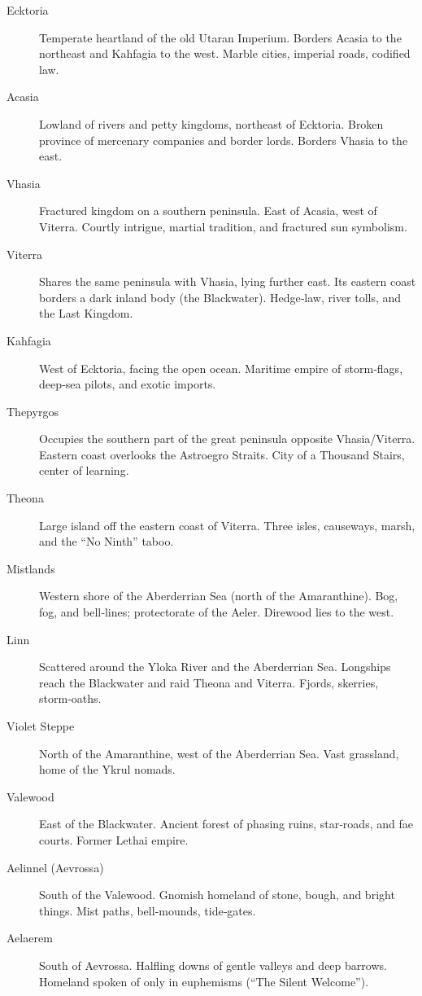 \begin{description}
  \item[Ecktoria]  Temperate heartland of the old Utaran Imperium. Borders Acasia to the northeast and Kahfagia to the west. Marble cities, imperial roads, codified law.
  \item[Acasia]  Lowland of rivers and petty kingdoms, northeast of Ecktoria. Broken province of mercenary companies and border lords. Borders Vhasia to the east.
  \item[Vhasia]  Fractured kingdom on a southern peninsula. East of Acasia, west of Viterra. Courtly intrigue, martial tradition, and fractured sun symbolism.
  \item[Viterra]  Shares the same peninsula with Vhasia, lying further east. Its eastern coast borders a dark inland body (the Blackwater). Hedge‑law, river tolls, and the Last Kingdom.
  \item[Kahfagia]  West of Ecktoria, facing the open ocean. Maritime empire of storm‑flags, deep‑sea pilots, and exotic imports.
  \item[Thepyrgos]  Occupies the southern part of the great peninsula opposite Vhasia/Viterra. Eastern coast overlooks the Astroegro Straits. City of a Thousand Stairs, center of learning.
  \item[Theona]  Large island off the eastern coast of Viterra. Three isles, causeways, marsh, and the ``No Ninth'' taboo.
  \item[Mistlands]  Western shore of the Aberderrian Sea (north of the Amaranthine). Bog, fog, and bell‑lines; protectorate of the Aeler. Direwood lies to the west.
  \item[Linn]  Scattered around the Yloka River and the Aberderrian Sea. Longships reach the Blackwater and raid Theona and Viterra. Fjords, skerries, storm‑oaths.
  \item[Violet Steppe]  North of the Amaranthine, west of the Aberderrian Sea. Vast grassland, home of the Ykrul nomads.
  \item[Valewood]  East of the Blackwater. Ancient forest of phasing ruins, star‑roads, and fae courts. Former Lethai empire.
  \item[Aelinnel (Aevrossa)]  South of the Valewood. Gnomish homeland of stone, bough, and bright things. Mist paths, bell‑mounds, tide‑gates.
  \item[Aelaerem]  South of Aevrossa. Halfling downs of gentle valleys and deep barrows. Homeland spoken of only in euphemisms (``The Silent Welcome'').

\end{description}
